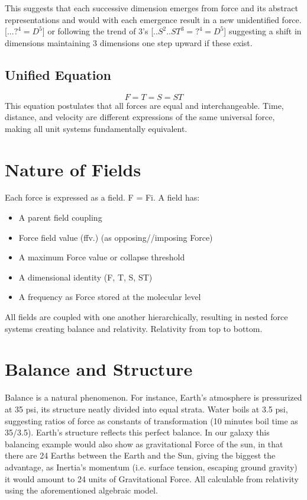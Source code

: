 \documentclass[12pt]{thesis}
\begin{document}
\noindent This suggests that each successive dimension emerges from force and its abstract representations and would with each emergence result in a new unidentified force. [$...?^4 = D^5$] or following the trend of 3's [$..S^2..ST^3 = ?^4 = D^5$] suggesting a shift in dimensions maintaining 3 dimensions one step upward if these exist.

\subsection{Unified Equation}
\[
F = T = S = ST
\]
This equation postulates that all forces are equal and interchangeable. Time, distance, and velocity are different expressions of the same universal force, making all unit systems fundamentally equivalent.

\section{Nature of Fields}
Each force is expressed as a field. F = Fi. A field has:
\begin{itemize}
    \item A parent field coupling
    \item Force field value (ffv.) (as opposing//imposing Force)
    \item A maximum Force value or collapse threshold
    \item A dimensional identity (F, T, S, ST)
    \item A frequency as Force stored at the molecular level
\end{itemize}

All fields are coupled with one another hierarchically, resulting in nested force systems creating balance and relativity. Relativity from top to bottom.

\section{Balance and Structure}
Balance is a natural phenomenon. For instance, Earth’s atmosphere is pressurized at 35 psi, its structure neatly divided into equal strata. Water boils at 3.5 psi, suggesting ratios of force as constants of transformation (10 minutes boil time as 35/3.5). Earth’s structure reflects this perfect balance. In our galaxy this balancing example would also show as gravitational Force of the sun, in that there are 24 Earths between the Earth and the Sun, giving the biggest the advantage, as Inertia's momentum (i.e. surface tension, escaping ground gravity) it would amount to 24 units of Gravitational Force. All calculable from relativity using the aforementioned algebraic model.
\end{document}
